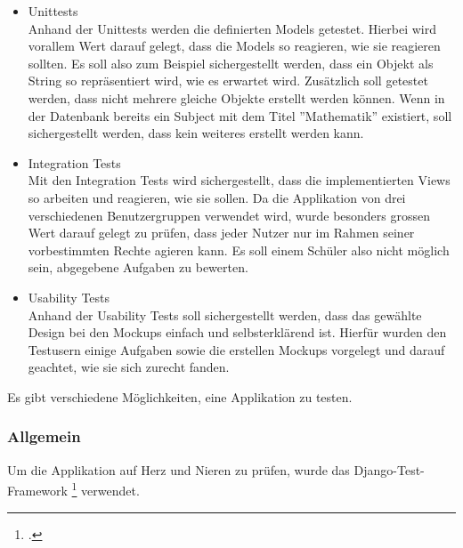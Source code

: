 \begin{itemize}
	\item Unittests \\
		Anhand der Unittests werden die definierten Models getestet. Hierbei wird vorallem Wert darauf gelegt, dass die Models so reagieren, wie sie reagieren sollten. Es soll also zum Beispiel sichergestellt werden, dass ein Objekt als String so repräsentiert wird, wie es erwartet wird. Zusätzlich soll getestet werden, dass nicht mehrere gleiche Objekte erstellt werden können. Wenn in der Datenbank bereits ein Subject mit dem Titel ''Mathematik'' existiert, soll sichergestellt werden, dass kein weiteres erstellt werden kann.
		
	\item Integration Tests \\
		Mit den Integration Tests wird sichergestellt, dass die implementierten Views so arbeiten und reagieren, wie sie sollen. Da die Applikation von drei verschiedenen Benutzergruppen verwendet wird, wurde besonders grossen Wert darauf gelegt zu prüfen, dass jeder Nutzer nur im Rahmen seiner vorbestimmten Rechte agieren kann. Es soll einem Schüler also nicht möglich sein, abgegebene Aufgaben zu bewerten.
		
	\item Usability Tests \\
		Anhand der Usability Tests soll sichergestellt werden, dass das gewählte Design bei den Mockups einfach und selbsterklärend ist. Hierfür wurden den Testusern einige Aufgaben sowie die erstellen Mockups vorgelegt und darauf geachtet, wie sie sich zurecht fanden.
\end{itemize}

Es gibt verschiedene Möglichkeiten, eine Applikation zu testen. 

\subsubsection*{Allgemein}
Um die Applikation auf Herz und Nieren zu prüfen, wurde das Django-Test-Framework \footcite{writing_tests} verwendet. 



